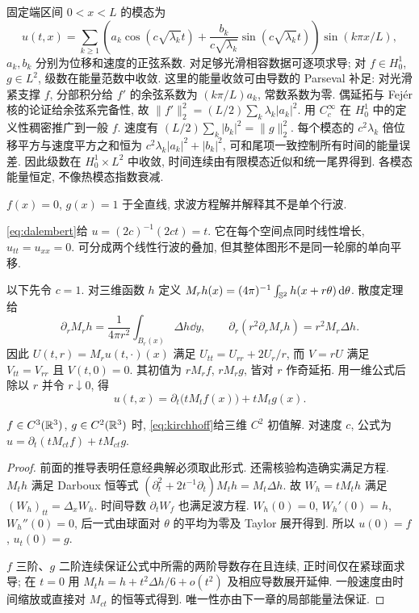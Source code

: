 固定端区间 $0<x<L$ 的模态为
\[
u(t,x)=\sum_{k\ge1}\left(a_k\cos(c\sqrt{\lambda_k}t)+\frac{b_k}{c\sqrt{\lambda_k}}\sin(c\sqrt{\lambda_k}t)\right)\sin(k\pi x/L),
\]
$a_k,b_k$ 分别为位移和速度的正弦系数. 对足够光滑相容数据可逐项求导; 对 $f\in H_0^1$, $g\in L^2$, 级数在能量范数中收敛. 这里的能量收敛可由导数的 Parseval 补足: 对光滑紧支撑 $f$, 分部积分给 $f'$ 的余弦系数为 $(k\pi/L)a_k$, 常数系数为零. 偶延拓与 Fejér 核的论证给余弦系完备性, 故 $\|f'\|_2^2=(L/2)\sum_k\lambda_k|a_k|^2$. 用 $C_c^\infty$ 在 $H_0^1$ 中的定义性稠密推广到一般 $f$. 速度有 $(L/2)\sum_k|b_k|^2=\|g\|_2^2$. 每个模态的 $c^2\lambda_k$ 倍位移平方与速度平方之和恒为 $c^2\lambda_k|a_k|^2+|b_k|^2$, 可和尾项一致控制所有时间的能量误差. 因此级数在 $H_0^1\times L^2$ 中收敛, 时间连续由有限模态近似和统一尾界得到. 各模态能量恒定, 不像热模态指数衰减.
\begin{example}
$f(x)=0$, $g(x)=1$ 于全直线, 求波方程解并解释其不是单个行波.
\end{example}
\begin{solution}
\eqref{eq:dalembert}给 $u=(2c)^{-1}(2ct)=t$. 它在每个空间点同时线性增长, $u_{tt}=u_{xx}=0$. 可分成两个线性行波的叠加, 但其整体图形不是同一轮廓的单向平移.
\end{solution}
以下先令 $c=1$. 对三维函数 $h$ 定义 $M_rh(x)=(4\pi)^{-1}\int_{\mathbb S^2}h(x+r\theta)\,\mathrm d\theta$. 散度定理给
\[
\partial_r M_rh=\frac1{4\pi r^2}\int_{B_r(x)}\Delta h\dd y,
\qquad \partial_r(r^2\partial_rM_rh)=r^2M_r\Delta h.
\]
因此 $U(t,r)=M_ru(t,\cdot)(x)$ 满足 $U_{tt}=U_{rr}+2U_r/r$, 而 $V=rU$ 满足 $V_{tt}=V_{rr}$ 且 $V(t,0)=0$. 其初值为 $rM_rf$, $rM_rg$, 皆对 $r$ 作奇延拓. 用一维公式后除以 $r$ 并令 $r\downarrow0$, 得
\begin{equation}\label{eq:kirchhoff}
u(t,x)=\partial_t\bigl(tM_tf(x)\bigr)+tM_tg(x).
\end{equation}
\begin{theorem}\label{thm:kirchhoff}
$f\in C^3(\mathbb R^3)$, $g\in C^2(\mathbb R^3)$ 时, \eqref{eq:kirchhoff}给三维 $C^2$ 初值解. 对速度 $c$, 公式为 $u=\partial_t(tM_{ct}f)+tM_{ct}g$.
\end{theorem}
\begin{proof}
前面的推导表明任意经典解必须取此形式. 还需核验构造确实满足方程. $M_th$ 满足 Darboux 恒等式 $(\partial_t^2+2t^{-1}\partial_t)M_th=M_t\Delta h$. 故 $W_h=tM_th$ 满足 $(W_h)_{tt}=\Delta_xW_h$. 时间导数 $\partial_tW_f$ 也满足波方程. $W_h(0)=0$, $W_h'(0)=h$, $W_h''(0)=0$, 后一式由球面对 $\theta$ 的平均为零及 Taylor 展开得到. 所以 $u(0)=f$, $u_t(0)=g$.

$f$ 三阶、$g$ 二阶连续保证公式中所需的两阶导数存在且连续, 正时间仅在紧球面求导; 在 $t=0$ 用 $M_th=h+t^2\Delta h/6+o(t^2)$ 及相应导数展开延伸. 一般速度由时间缩放或直接对 $M_{ct}$ 的恒等式得到. 唯一性亦由下一章的局部能量法保证.
\end{proof}
